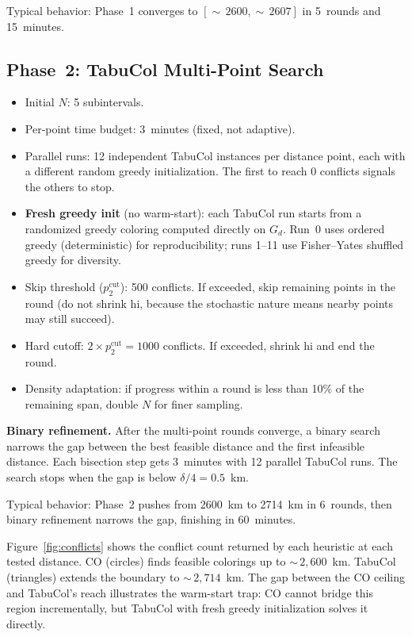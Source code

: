 \documentclass[11pt,a4paper]{article}
\begin{document}
Typical behavior: Phase~1 converges to $[{\sim}\, 2600, {\sim}\, 2607]$ in 5~rounds and
15~minutes.

\subsection{Phase~2: TabuCol Multi-Point Search}

\begin{itemize}
  \item Initial $N$: 5 subintervals.
  \item Per-point time budget: 3~minutes (fixed, not adaptive).
  \item Parallel runs: 12 independent TabuCol instances per distance point, each with a
        different random greedy initialization. The first to reach 0 conflicts signals the
        others to stop.
  \item \textbf{Fresh greedy init} (no warm-start): each TabuCol run starts from a
        randomized greedy coloring computed directly on $G_d$. Run~0 uses ordered greedy
        (deterministic) for reproducibility; runs 1--11 use Fisher--Yates shuffled greedy
        for diversity.
  \item Skip threshold ($p_2^{\text{cut}}$): 500 conflicts. If exceeded, skip remaining
        points in the round (do not shrink hi, because the stochastic nature means nearby
        points may still succeed).
  \item Hard cutoff: $2 \times p_2^{\text{cut}} = 1000$ conflicts. If exceeded, shrink hi
        and end the round.
  \item Density adaptation: if progress within a round is less than 10\% of the remaining
        span, double $N$ for finer sampling.
\end{itemize}

\textbf{Binary refinement.} After the multi-point rounds converge, a binary search
narrows the gap between the best feasible distance and the first infeasible distance. Each
bisection step gets 3~minutes with 12 parallel TabuCol runs. The search stops when the
gap is below $\delta / 4 = 0.5$~km.

Typical behavior: Phase~2 pushes from 2600~km to 2714~km in 6~rounds, then binary
refinement narrows the gap, finishing in 60~minutes.

Figure~\ref{fig:conflicts} shows the conflict count returned by each heuristic at each
tested distance. CO (circles) finds feasible colorings up to ${\sim}\, 2{,}600$~km. TabuCol
(triangles) extends the boundary to ${\sim}\, 2{,}714$~km. The gap between the CO ceiling and
TabuCol's reach illustrates the warm-start trap: CO cannot bridge this region
incrementally, but TabuCol with fresh greedy initialization solves it directly.
\end{document}
